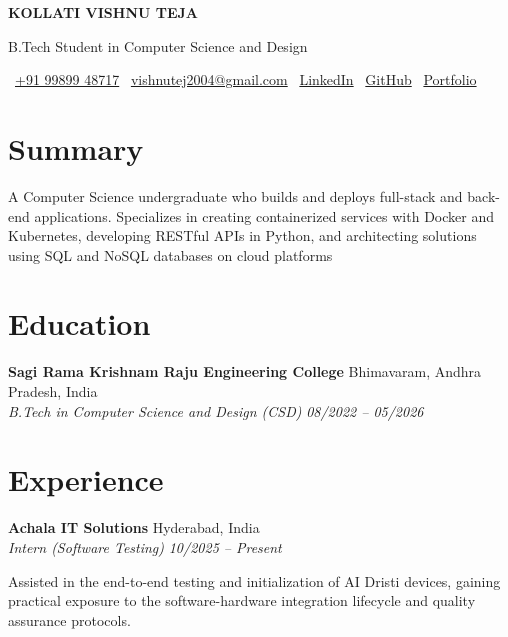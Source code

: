 \documentclass[letterpaper]{article}
\renewcommand{\normalsize}{\fontsize{10pt}{12pt}\selectfont}
\begin{document}
\begin{center}
    \fontsize{17pt}{20pt}\selectfont\textbf{KOLLATI VISHNU TEJA}
    
    \vspace{3pt}
    \normalsize
    B.Tech Student in Computer Science and Design
    
    \vspace{5pt}
    \small
    \faPhone\ \href{tel:+919989948717}{+91 99899 48717} \quad\textbar\quad 
    \faEnvelope\ \href{mailto:vishnutej2004@gmail.com}{vishnutej2004@gmail.com} \quad\textbar\quad 
    \faLinkedin\ \href{https://www.linkedin.com/in/vishnutej0098/}{LinkedIn} \quad\textbar\quad 
    \faGithub\ \href{https://github.com/vishnutej000}{GitHub} \quad\textbar\quad 
    \faGlobe\ \href{https://vishnutej.tech}{Portfolio} \\[3pt]
\end{center}

\section{Summary}
A Computer Science undergraduate who builds and deploys full-stack and back-end applications. Specializes in creating containerized services with Docker and Kubernetes, developing RESTful APIs in Python, and architecting solutions using SQL and NoSQL databases on cloud platforms
\section{Education}
\textbf{Sagi Rama Krishnam Raju Engineering College} \hfill Bhimavaram, Andhra Pradesh, India \\
\textit{B.Tech in Computer Science and Design (CSD)} \hfill \textit{08/2022 -- 05/2026}

\section{Experience}

\textbf{Achala IT Solutions} \hfill Hyderabad, India \\
\textit{Intern (Software Testing)} \hfill \textit{10/2025 -- Present}
\begin{highlights}
\item Assisted in the end-to-end testing and initialization of AI Dristi devices, gaining practical exposure to the software-hardware integration lifecycle and quality assurance protocols.
\end{highlights}
\end{document}
